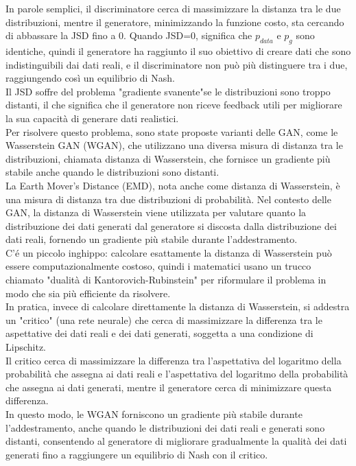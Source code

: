 In parole semplici, il discriminatore cerca di massimizzare la distanza tra le due distribuzioni, mentre il generatore, minimizzando la funzione costo, sta cercando di abbassare la JSD fino a 0. Quando JSD=0, significa che $p_{data}$ e $p_g$ sono identiche, quindi il generatore ha raggiunto il suo obiettivo di creare dati che sono indistinguibili dai dati reali, e il discriminatore non può più distinguere tra i due, raggiungendo così un equilibrio di Nash.\\

Il JSD soffre del problema "gradiente svanente"se le distribuzioni sono troppo distanti, il che significa che il generatore non riceve feedback utili per migliorare la sua capacità di generare dati realistici.\\
Per risolvere questo problema, sono state proposte varianti delle GAN, come le Wasserstein GAN (WGAN), che utilizzano una diversa misura di distanza tra le distribuzioni, chiamata distanza di Wasserstein, che fornisce un gradiente più stabile anche quando le distribuzioni sono distanti.\\

La Earth Mover's Distance (EMD), nota anche come distanza di Wasserstein, è una misura di distanza tra due distribuzioni di probabilità. Nel contesto delle GAN, la distanza di Wasserstein viene utilizzata per valutare quanto la distribuzione dei dati generati dal generatore si discosta dalla distribuzione dei dati reali, fornendo un gradiente più stabile durante l'addestramento.\\

C'é un piccolo inghippo: calcolare esattamente la distanza di Wasserstein può essere computazionalmente costoso, quindi i matematici usano un trucco chiamato "dualità di Kantorovich-Rubinstein" per riformulare il problema in modo che sia più efficiente da risolvere.\\
In pratica, invece di calcolare direttamente la distanza di Wasserstein, si addestra un "critico" (una rete neurale) che cerca di massimizzare la differenza tra le aspettative dei dati reali e dei dati generati, soggetta a una condizione di Lipschitz.\\
Il critico cerca di massimizzare la differenza tra l'aspettativa del logaritmo della probabilità che assegna ai dati reali e l'aspettativa del logaritmo della probabilità che assegna ai dati generati, mentre il generatore cerca di minimizzare questa differenza.\\
In questo modo, le WGAN forniscono un gradiente più stabile durante l'addestramento, anche quando le distribuzioni dei dati reali e generati sono distanti, consentendo al generatore di migliorare gradualmente la qualità dei dati generati fino a raggiungere un equilibrio di Nash con il critico.\\

